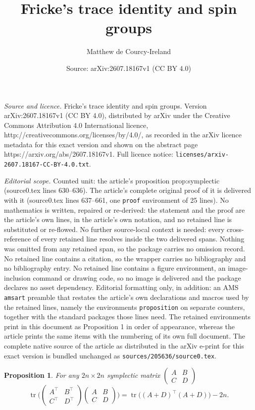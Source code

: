 \documentclass[10pt,a4paper]{amsart}
\title{Fricke's trace identity and spin groups}
\author{Matthew de Courcy-Ireland}
\date{Source: arXiv:2607.18167v1 (CC BY 4.0)}
\newtheorem{proposition}{Proposition}
\newcommand{\tr}{\operatorname{tr}}
\begin{document}
\maketitle

\noindent\emph{Source and licence.} Fricke's trace identity and spin groups. Version arXiv:2607.18167v1 (CC BY 4.0), distributed by arXiv under the Creative Commons Attribution 4.0 International licence, http://creativecommons.org/licenses/by/4.0/, as recorded in the arXiv licence metadata for this exact version and shown on the abstract page https://arxiv.org/abs/2607.18167v1. Full licence notice: \texttt{licenses/arxiv-2607.18167-CC-BY-4.0.txt}.\par\smallskip

\noindent\textit{Editorial scope.} Counted unit: the article's proposition prop:symplectic (source0.tex lines 630--636). The article's complete original proof of it is delivered with it (source0.tex lines 637--661, one \texttt{proof} environment of 25 lines). No mathematics is written, repaired or re-derived: the statement and the proof are the article's own lines, in the article's own notation, and no retained line is substituted or re-flowed.  No further source-local context is needed: every cross-reference of every retained line resolves inside the two delivered spans.  Nothing was omitted from any retained span, so the package carries no omission record.  No retained line contains a citation, so the wrapper carries no bibliography and no bibliography entry.  No retained line contains a figure environment, an image-inclusion command or drawing code, so no image is delivered and the package declares no asset dependency.  Editorial formatting only, in addition: an AMS \texttt{amsart} preamble that restates the article's own declarations and macros used by the retained lines, namely the environments \texttt{proposition} on separate counters, together with the standard packages those lines need.  The retained environments print in this document as Proposition 1 in order of appearance, whereas the article prints the same items with the numbering of its own full document.  The complete native source of the article as distributed in the arXiv e-print for this exact version is bundled unchanged as \texttt{sources/205636/source0.tex}.
\begin{proposition} \label{prop:symplectic}
For any $2n \times 2n$ symplectic matrix $\begin{pmatrix} A & B \\ C & D \end{pmatrix}$
\begin{equation} \label{eqn:symplectic}
\tr \Big( \begin{pmatrix} A^{\top} & B^{\top} \\ C^{\top} & D^{\top} \end{pmatrix}\begin{pmatrix} A & B \\ C & D \end{pmatrix} \Big) = \tr\big( (A+D)^{\top} (A+D) \big) - 2n
.
\end{equation}
\end{proposition}
\end{document}
